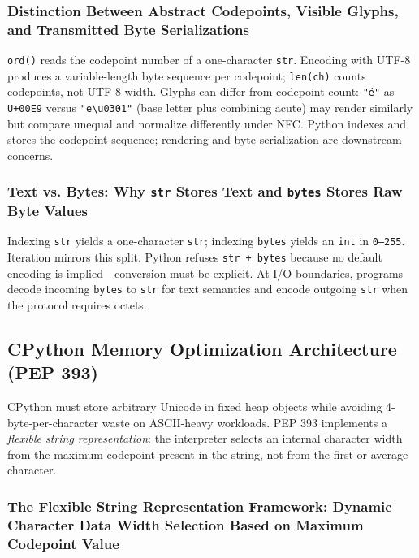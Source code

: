 \documentclass[a4paper,twoside]{report}
\begin{document}
\subsubsection{Distinction Between Abstract Codepoints, Visible Glyphs, and Transmitted Byte Serializations}

\texttt{ord()} reads the codepoint number of a one-character \texttt{str}. Encoding with UTF-8 produces a variable-length byte sequence per codepoint; \texttt{len(ch)} counts codepoints, not UTF-8 width. Glyphs can differ from codepoint count: \texttt{"é"} as \texttt{U+00E9} versus \texttt{"e\textbackslash u0301"} (base letter plus combining acute) may render similarly but compare unequal and normalize differently under NFC. Python indexes and stores the codepoint sequence; rendering and byte serialization are downstream concerns.

\subsubsection{Text vs. Bytes: Why \texttt{str} Stores Text and \texttt{bytes} Stores Raw Byte Values}

Indexing \texttt{str} yields a one-character \texttt{str}; indexing \texttt{bytes} yields an \texttt{int} in \texttt{0--255}. Iteration mirrors this split. Python refuses \texttt{str + bytes} because no default encoding is implied---conversion must be explicit. At I/O boundaries, programs decode incoming \texttt{bytes} to \texttt{str} for text semantics and encode outgoing \texttt{str} when the protocol requires octets.


\subsection{CPython Memory Optimization Architecture (PEP 393)}

CPython must store arbitrary Unicode in fixed heap objects while avoiding 4-byte-per-character waste on ASCII-heavy workloads. PEP 393 implements a \emph{flexible string representation}: the interpreter selects an internal character width from the maximum codepoint present in the string, not from the first or average character.

\subsubsection{The Flexible String Representation Framework: Dynamic Character Data Width Selection Based on Maximum Codepoint Value}
\end{document}
